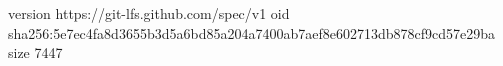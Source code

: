version https://git-lfs.github.com/spec/v1
oid sha256:5e7ec4fa8d3655b3d5a6bd85a204a7400ab7aef8e602713db878cf9cd57e29ba
size 7447
